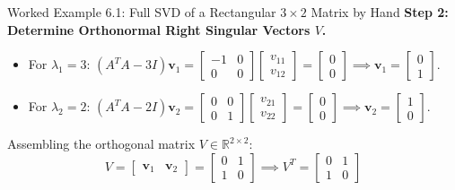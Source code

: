 \begin{examplebox}[breakable]{Worked Example 6.1: Full SVD of a Rectangular $3 \times 2$ Matrix by Hand}
\textbf{Step 2: Determine Orthonormal Right Singular Vectors $V$.}
\begin{itemize}
    \item For $\lambda_1 = 3$: $(A^T A - 3I)\mathbf{v}_1 = \begin{bmatrix} -1 & 0 \\ 0 & 0 \end{bmatrix}\begin{bmatrix} v_{11} \\ v_{12} \end{bmatrix} = \begin{bmatrix} 0 \\ 0 \end{bmatrix} \implies \mathbf{v}_1 = \begin{bmatrix} 0 \\ 1 \end{bmatrix}$.
    \item For $\lambda_2 = 2$: $(A^T A - 2I)\mathbf{v}_2 = \begin{bmatrix} 0 & 0 \\ 0 & 1 \end{bmatrix}\begin{bmatrix} v_{21} \\ v_{22} \end{bmatrix} = \begin{bmatrix} 0 \\ 0 \end{bmatrix} \implies \mathbf{v}_2 = \begin{bmatrix} 1 \\ 0 \end{bmatrix}$.
\end{itemize}
Assembling the orthogonal matrix $V \in \mathbb{R}^{2 \times 2}$:
\begin{equation}
V = \begin{bmatrix} \mathbf{v}_1 & \mathbf{v}_2 \end{bmatrix} = \begin{bmatrix} 0 & 1 \\ 1 & 0 \end{bmatrix} \implies V^T = \begin{bmatrix} 0 & 1 \\ 1 & 0 \end{bmatrix}
\end{equation}


\end{examplebox}
